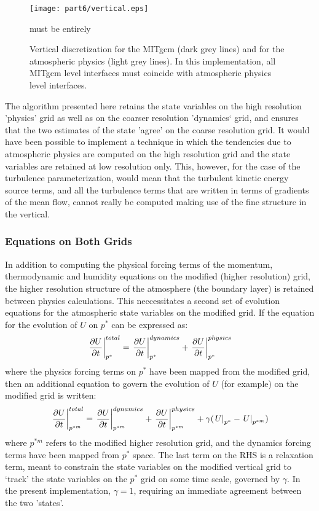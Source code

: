 \begin{figure}[htbp]
\vspace*{-0.4in}
\begin{center}
\texttt{[image: part6/vertical.eps]}
\caption{Vertical discretization for the MITgcm (dark grey lines) and for the
atmospheric physics (light grey lines). In this implementation, all MITgcm level
interfaces must coincide with atmospheric physics level interfaces.}
must be entirely
\end{center}
\end{figure}

The algorithm presented here retains the state variables on the high resolution 'physics'
grid as well as on the coarser resolution 'dynamics` grid, and ensures that the two 
estimates of the state 'agree' on the coarse resolution grid.  It would have been possible 
to implement a technique in which the tendencies due to atmospheric physics are computed 
on the high resolution grid and the state variables are retained at low resolution only. 
This, however, for the case of the turbulence parameterization,  would mean that the 
turbulent kinetic energy source terms, and all the turbulence terms that are written 
in terms of gradients of the mean flow, cannot really be computed making use of the fine 
structure in the vertical. 

\subsubsection{Equations on Both Grids}

In addition to computing the physical forcing terms of the momentum, thermodynamic and humidity 
equations on the modified (higher resolution) grid, the higher resolution structure of the 
atmosphere (the boundary layer) is retained between physics calculations. This neccessitates
a second set of evolution equations for the atmospheric state variables on the modified grid. 
If the equation for the evolution of $U$ on $p^*$ can be expressed as:
\[
\left . {\partial U \over {\partial t}} \right |_{p^*}^{total} = 
\left . {\partial U \over {\partial t}} \right |_{p^*}^{dynamics} + 
\left . {\partial U \over {\partial t}} \right |_{p^*}^{physics}
\]
where the physics forcing terms on $p^*$ have been mapped from the modified grid, then an additional 
equation to govern the evolution of $U$ (for example) on the modified grid is written:
\[
\left . {\partial U \over {\partial t}} \right |_{p^{*m}}^{total} = 
\left . {\partial U \over {\partial t}} \right |_{p^{*m}}^{dynamics} + 
\left . {\partial U \over {\partial t}} \right |_{p^{*m}}^{physics} +
\gamma ({\left . U \right |_{p^*}} - {\left . U \right |_{p^{*m}}})
\]
where $p^{*m}$ refers to the modified higher resolution grid, and the dynamics forcing terms have 
been mapped from $p^*$ space.  The last term on the RHS is a relaxation term, meant to constrain
the state variables on the modified vertical grid to `track' the state variables on the $p^*$ grid 
on some time scale, governed by $\gamma$. In the present implementation, $\gamma = 1$, requiring
an immediate agreement between the two 'states'.

